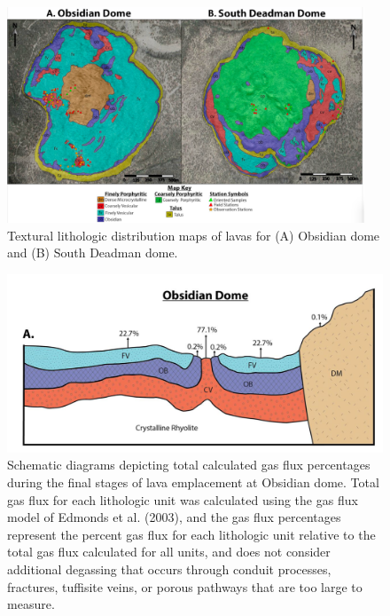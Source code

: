 \documentclass[11pt]{amsart}
\begin{document}
\begin{figure}
   \centering
\includegraphics[width=0.95\textwidth]{figs/unitMapping-small.png}
\caption{Textural lithologic distribution maps of lavas for (A) Obsidian dome and (B) South Deadman dome.}
\label{fig:unitMapping}
\end{figure}

\begin{figure}
   \centering
\includegraphics[scale=0.5]{figs/crossSection.png}
\caption{Schematic diagrams depicting total calculated gas flux percentages during the final stages of lava emplacement at Obsidian dome. Total gas flux for each lithologic unit was calculated using the gas flux model of Edmonds et al. (2003), and the gas flux percentages represent the percent gas flux for each lithologic unit relative to the total gas flux calculated for all units, and does not consider additional degassing that occurs through conduit processes, fractures, tuffisite veins, or porous pathways that are too large to measure.}
\label{fig:crossSection}
\end{figure}
\end{document}
